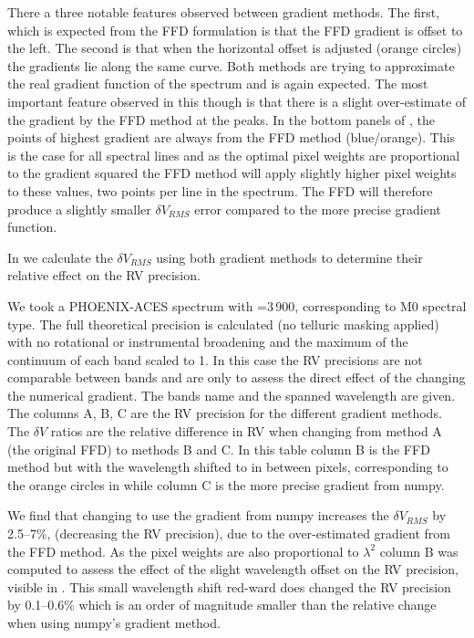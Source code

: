 There a three notable features observed between gradient methods. 
The first, which is expected from the {FFD} formulation is that the {FFD} gradient is offset to the left. 
The second is that when the horizontal offset is adjusted (orange circles) the gradients lie along the same curve. 
Both methods are trying to approximate the real gradient function of the spectrum and is again expected.
The most important feature observed in this though is that there is a slight over-estimate of the gradient by the {FFD} method at the peaks. 
In the bottom panels of , the points of highest gradient are always from the {FFD} method (blue/orange). 
This is the case for all spectral lines and as the optimal pixel weights are proportional to the gradient squared the {FFD} method will apply slightly higher pixel weights to these values, two points per line in the spectrum. 
The {FFD} will therefore produce a slightly smaller \(\delta V_{RMS}\) error compared to the more precise gradient function.

In  we calculate the  \(\delta V_{RMS}\) using both gradient methods to determine their relative effect on the {RV} precision.

We took a {PHOENIX-ACES} spectrum with \teff{}=3\,900\K{}, corresponding to {{M0}} spectral type. 
The full theoretical precision is calculated (no telluric masking applied) with no rotational or instrumental broadening and the maximum of the continuum of each band scaled to 1. 
In this case the {RV} precisions are not comparable between bands and are only to assess the direct effect of the changing the numerical gradient. 
The bands name and the spanned wavelength are given. 
The columns A, B, C are the {RV} precision for the different gradient methods. 
The \(\delta V\) ratios are the relative difference in {RV} when changing from method A (the original {FFD}) to methods B and C. 
In this table column B is the {FFD} method but with the wavelength shifted to in between pixels, corresponding to the orange circles in  while column C is the more precise gradient from numpy.

We find that changing to use the gradient from numpy increases the \(\delta V_{RMS}\) by 2.5--7\%, (decreasing the {RV} precision), due to the over-estimated gradient from the {FFD} method. 
As the pixel weights  are also proportional to \({\lambda}^{2}\) column B was computed to assess the effect of the slight wavelength offset on the {RV} precision, visible in . 
This small wavelength shift red-ward does changed the {RV} precision by 0.1--0.6\% which is an order of magnitude smaller than the relative change when using numpy's gradient method.

